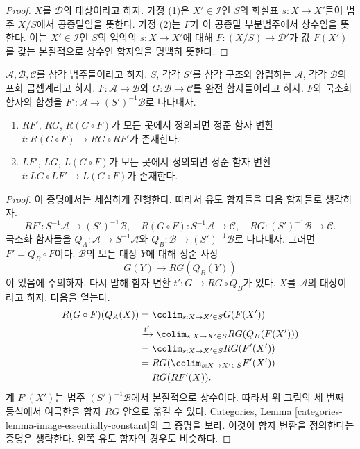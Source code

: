 \begin{proof}
$X$를 $\mathcal{D}$의 대상이라고 하자. 가정 (1)은
$X' \in \mathcal{I}$인 $S$의 화살표 $s : X \to X'$들이 범주 $X/S$에서
공종말임을 뜻한다. 가정 (2)는 $F$가 이 공종말 부분범주에서 상수임을
뜻한다. 이는 $X' \in \mathcal{I}$인 $S$의 임의의
$s : X \to X'$에 대해 $F : (X/S) \to \mathcal{D}'$가 값 $F(X')$를
갖는 본질적으로 상수인 함자임을 명백히 뜻한다.
\end{proof}

\begin{lemma}
\label{lemma-compose-derived-functors-general}
$\mathcal{A}, \mathcal{B}, \mathcal{C}$를 삼각 범주들이라고 하자.
$S$, 각각 $S'$를 삼각 구조와 양립하는 $\mathcal{A}$, 각각
$\mathcal{B}$의 포화 곱셈계라고 하자.
$F : \mathcal{A} \to \mathcal{B}$와 $G : \mathcal{B} \to \mathcal{C}$를
완전 함자들이라고 하자. $F$와 국소화 함자의 합성을
$F' : \mathcal{A} \to (S')^{-1}\mathcal{B}$로 나타내자.
\begin{enumerate}
\item $RF'$, $RG$, $R(G \circ F)$가 모든 곳에서 정의되면 정준 함자 변환
$t : R(G \circ F) \longrightarrow RG \circ RF'$가 존재한다.
\item $LF'$, $LG$, $L(G \circ F)$가 모든 곳에서 정의되면 정준 함자 변환
$t : LG \circ LF' \to L(G \circ F)$가 존재한다.
\end{enumerate}
\end{lemma}

\begin{proof}
이 증명에서는 세심하게 진행한다. 따라서 유도 함자들을 다음 함자들로
생각하자.
$$
RF' : S^{-1}\mathcal{A} \to (S')^{-1}\mathcal{B}, \quad
R(G \circ F) : S^{-1}\mathcal{A} \to \mathcal{C}, \quad
RG : (S')^{-1}\mathcal{B} \to \mathcal{C}.
$$
국소화 함자들을
$Q_A : \mathcal{A} \to S^{-1}\mathcal{A}$와
$Q_B : \mathcal{B} \to (S')^{-1}\mathcal{B}$로 나타내자.
그러면 $F' = Q_B \circ F$이다. $\mathcal{B}$의 모든 대상 $Y$에 대해
정준 사상
$$
G(Y) \longrightarrow RG(Q_B(Y))
$$
이 있음에 주의하자. 다시 말해 함자 변환
$t' : G \to RG \circ Q_B$가 있다. $X$를 $\mathcal{A}$의 대상이라고
하자. 다음을 얻는다.
\begin{align*}
R(G \circ F)(Q_A(X))
& = \colim_{s : X \to X' \in S} G(F(X')) \\
& \xrightarrow{t'} \colim_{s : X \to X' \in S} RG(Q_B(F(X'))) \\
& = \colim_{s : X \to X' \in S} RG(F'(X')) \\
& = RG(\colim_{s : X \to X' \in S} F'(X')) \\
& = RG(RF'(X)).
\end{align*}
계 $F'(X')$는 범주 $(S')^{-1}\mathcal{B}$에서 본질적으로 상수이다.
따라서 위 그림의 세 번째 등식에서 여극한을 함자 $RG$ 안으로 옮길 수 있다.
Categories, Lemma \ref{categories-lemma-image-essentially-constant}와 그
증명을 보라. 이것이 함자 변환을 정의한다는 증명은 생략한다.
왼쪽 유도 함자의 경우도 비슷하다.
\end{proof}
